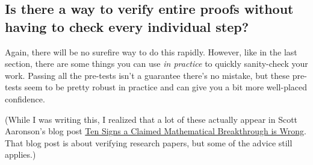 \documentclass[11pt]{scrartcl}
\begin{document}
\subsection{Is there a way to verify entire proofs
  without having to check every individual step?}

Again, there will be no surefire way to do this rapidly.
However, like in the last section, there are some things you can use
\emph{in practice} to quickly sanity-check your work.
Passing all the pre-tests isn't a guarantee there's no mistake,
but these pre-tests seem to be pretty robust in practice and can
give you a bit more well-placed confidence.

(While I was writing this, I realized that a lot of these
actually appear in Scott Aaronson's blog post
\href{https://scottaaronson.blog/?p=304}
{Ten Signs a Claimed Mathematical Breakthrough is Wrong}.
That blog post is about verifying research papers,
but some of the advice still applies.)
\end{document}
